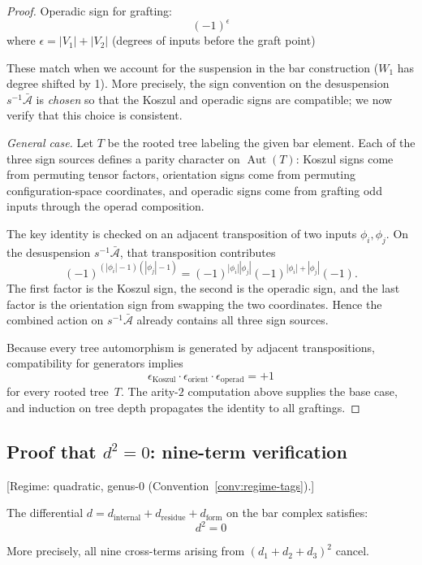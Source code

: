 \begin{proof}
Operadic sign for grafting:
\[(-1)^{\epsilon}\] where $\epsilon = |V_1| + |V_2|$ (degrees of inputs before the graft point)

These match when we account for the suspension in the bar construction ($W_1$ has degree shifted by 1).  More precisely, the sign convention on the desuspension $s^{-1}\bar{\mathcal{A}}$ is \emph{chosen} so that the Koszul and operadic signs are compatible; we now verify that this choice is consistent.

\emph{General case.}
Let $T$ be the rooted tree labeling the given bar element.  Each of
the three sign sources defines a parity character on $\operatorname{Aut}(T)$:
Koszul signs come from permuting tensor factors, orientation signs
come from permuting configuration-space coordinates, and operadic
signs come from grafting odd inputs through the operad composition.

The key identity is checked on an adjacent transposition of two inputs
$\phi_i,\phi_j$.  On the desuspension $s^{-1}\bar{\mathcal{A}}$, that
transposition contributes
\[
(-1)^{(|\phi_i|-1)(|\phi_j|-1)}
= (-1)^{|\phi_i||\phi_j|}
  (-1)^{|\phi_i|+|\phi_j|}
  (-1).
\]
The first factor is the Koszul sign, the second is the operadic sign,
and the last factor is the orientation sign from swapping the two
coordinates.  Hence the combined action on
$s^{-1}\bar{\mathcal{A}}$ already contains all three sign sources.

Because every tree automorphism is generated by adjacent
transpositions, compatibility for generators implies
\[
\epsilon_{\mathrm{Koszul}} \cdot
\epsilon_{\mathrm{orient}} \cdot
\epsilon_{\mathrm{operad}} = +1
\]
for every rooted tree~$T$.  The arity-$2$ computation above supplies
the base case, and induction on tree depth propagates the identity to
all graftings.
\end{proof}

\subsection{\texorpdfstring{Proof that $d^2 = 0$: nine-term verification}{Proof that d2 = 0: nine-term verification}}\label{sec:bar-nilpotency-nine-terms-complete}\label{sec:bar-nilpotency}

\begin{theorem}\label{thm:bar-nilpotency-complete}
\textup{[Regime: quadratic, genus-$0$
\textup{(}Convention~\textup{\ref{conv:regime-tags})}.]}

The differential $d = d_{\text{internal}} + d_{\text{residue}} + d_{\text{form}}$ on the bar complex satisfies:
\[d^2 = 0\]

More precisely, all nine cross-terms arising from $(d_1 + d_2 + d_3)^2$ cancel.
\end{theorem}


